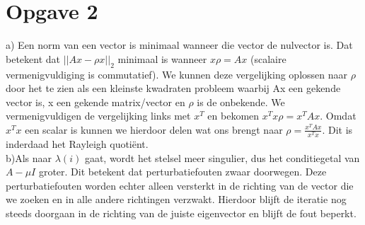 \documentclass[]{article}
\newcommand{\opgave}[1]{\section*{Opgave #1}}
\begin{document}
\opgave2
a) Een norm van een vector is minimaal wanneer die vector de nulvector is.
Dat betekent dat $||Ax-\rho x||_{2}$ minimaal is wanneer $x \rho = Ax$ (scalaire vermenigvuldiging is commutatief). We kunnen deze vergelijking oplossen naar $\rho$ door het te zien als een kleinste kwadraten probleem waarbij Ax een gekende vector is, x een gekende matrix/vector en $\rho$ is de onbekende. We vermenigvuldigen de vergelijking links met $x^T$ en bekomen $x^{T}x \rho = x^{T}Ax$. Omdat $x^{T}x$ een scalar is kunnen we hierdoor delen wat ons brengt naar $\rho = \frac{ x^{T}Ax}{x^{T}x}$. Dit is inderdaad het Rayleigh quoti\"{e}nt.\\


b)Als \mu naar $\lambda(i)$ gaat, wordt het stelsel meer singulier, dus het conditiegetal van $A-\mu I$ groter. Dit betekent dat perturbatiefouten zwaar doorwegen. Deze perturbatiefouten worden echter alleen versterkt in de richting van de vector die we zoeken en in alle andere richtingen verzwakt. Hierdoor blijft de iteratie nog steeds doorgaan in de richting van de juiste eigenvector en blijft de fout beperkt.
\end{document}
